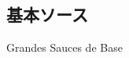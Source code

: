 \begin{main}

\hypertarget{grandes-sauces-de-base}{%
\section{基本ソース}\label{grandes-sauces-de-base}}

\begin{frsecenv}

Grandes Sauces de Base

\end{frsecenv}


\end{main}

